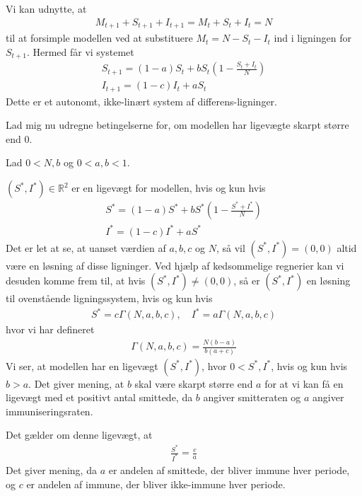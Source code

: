 \documentclass[12pt]{article}
\begin{document}
Vi kan udnytte, at 
\begin{align}
M_{t+1} + S_{t+1} + I_{t+1} = M_t + S_t + I_t = N
\end{align}
til at forsimple modellen ved at substituere $M_t = N - S_t - I_t$ ind i ligningen for $S_{t+1}$. Hermed får vi systemet
\begin{align}
S_{t+1} = (1-a)S_t + bS_t\left(1 - \frac{S_t + I_t}{N}\right)\\
I_{t+1} = (1-c)I_t + aS_t
\end{align}
Dette er et autonomt, ikke-linært system af differens-ligninger.

Lad mig nu udregne betingelserne for, om modellen har ligevægte skarpt større end 0.

Lad $0 < N, b$ og $0 < a,b < 1$. 

$(S^*,I^*)\in \mathbb{R}^2$ er en ligevægt for modellen, hvis og kun hvis
\begin{align}
S^* = (1-a)S^* + bS^*\left(1 - \frac{S^* + I^*}{N} \right)\\
I^* = (1-c)I^* + aS^*
\end{align}
Det er let at se, at uanset værdien af $a, b, c$ og $N$, så vil $(S^*,I^*)=(0,0)$ altid være en løsning af disse ligninger. Ved hjælp af kedsommelige regnerier kan vi desuden komme frem til, at hvis $(S^*,I^*)\neq(0,0)$, så er $(S^*,I^*)$ en løsning til ovenstående ligningssystem, hvis og kun hvis
\begin{align}
S^* = c\Gamma(N,a,b,c), \quad I^* = a\Gamma(N,a,b,c)
\end{align}
hvor vi har defineret
\begin{align}
\Gamma(N,a,b,c) =  \frac{N(b-a)}{b(a+c)}
\end{align}
Vi ser, at modellen har en ligevægt $(S^*, I^*)$, hvor $0<S^*, I^*$, hvis og kun hvis $b>a$. Det giver mening, at $b$ skal være skarpt større end $a$ for at vi kan få en ligevægt med et positivt antal smittede, da $b$ angiver smitteraten og $a$ angiver immuniseringsraten.

Det gælder om denne ligevægt, at 
\begin{align}
\frac{S^*}{I^*} = \frac{c}{a}
\end{align}
Det giver mening, da $a$ er andelen af smittede, der bliver immune hver periode, og $c$ er andelen af immune, der bliver ikke-immune hver periode.
\end{document}
